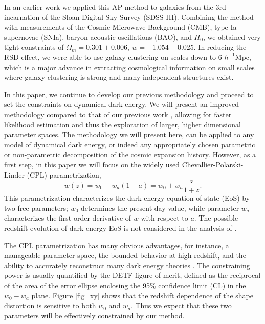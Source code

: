 \documentclass[iop]{emulateapj}
\begin{document}
In an earlier work \citep{Li2016} we applied this AP method to galaxies from the 3rd incarnation of the Sloan Digital Sky Survey (SDSS-III). 
Combining the method with measurements of the Cosmic Microwave Background (CMB), type Ia supernovae (SNIa), 
baryon acoustic oscillations (BAO), and $H_0$,
we obtained very tight constraints of $ \Omega_m = 0.301 \pm 0.006,\ w=-1.054 \pm 0.025$.
In reducing the RSD effect, 
we were able to use galaxy clustering on scales down to 6 $h^{-1}$Mpc,
which is a major advance in extracting cosmological information 
on small scales where galaxy clustering is strong and many independent structures exist.



In this paper, we continue to develop our previous methodology and proceed to set the constraints on dynamical dark energy. 
We will present an improved methodology compared to that of our previous work \citep{Li2016}, 
allowing for faster likelihood estimation and thus the exploration of larger, higher dimensional parameter spaces. 
The methodology we will present here, can be applied to any model of dynamical dark energy, 
or indeed any appropriately chosen parametric or non-parametric decomposition of the cosmic expansion history. 
However, as a first step, in this paper we will focus on the widely used Chevallier-Polarski-Linder (CPL) parametrization\citep{CPL_CP,CPL_L},
\begin{equation}
w(z) = w_0 + w_a (1-a) = w_0 + w_a \frac{z}{1+z}.
\end{equation}
This parametrization characterizes the dark energy equation-of-state (EoS) by two free parameters;
$w_0$ determines the present-day value, while parameter $w_a$ characterizes the first-order derivative of $w$ with respect to $a$. 
The possible redshift evolution of dark energy EoS is not considered in the analysis of \cite{Li2016}. 

The CPL parametrization has many obvious advantages, for instance, a manageable parameter space, 
the bounded behavior at high redshift, 
and the ability to accurately reconstruct many dark energy theories \citep{CPL_L}. 
The constraining power is usually quantified by the DETF  \citep[Dark Energy Task Force;][]{DETF} figure of merit, 
defined as the reciprocal of the area of the error ellipse enclosing the 95\% confidence limit (CL) in the $w_0 - w_a$ plane. 
Figure \ref{fig_xy} shows that the redshift dependence of the shape distortion is sensitive to both $w_0$ and $w_a$.
Thus we expect that these two parameters will be effectively constrained by our method.
\end{document}
